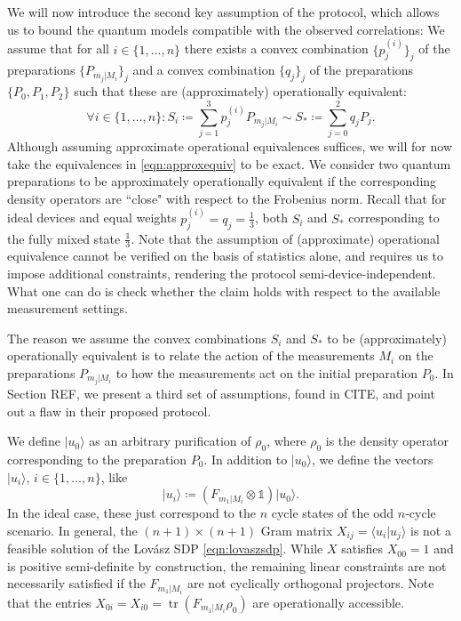 We will now introduce the second key assumption of the protocol, which allows us to bound the quantum models compatible with the observed correlations: We assume that for all $i\in\{1,\dots,n\}$ there exists a convex combination $\{p_j^{(i)}\}_j$ of the preparations $\{P_{m_j\vert M_i}\}_j$ and a convex combination $\{q_j\}_j$ of the preparations $\{P_0,P_1,P_2\}$ such that these are (approximately) operationally equivalent:
\begin{equation}
\label{eqn:approxequiv}
\forall i\in\{1,\dots,n\}: S_i \coloneqq \sum_{j=1}^3 p_j^{(i)}P_{m_j\vert M_i} \sim S_* \coloneqq \sum_{j=0}^2 q_j P_j.
\end{equation}
Although assuming approximate operational equivalences suffices, we will for now take the equivalences in \ref{eqn:approxequiv} to be exact. We consider two quantum preparations to be approximately operationally equivalent if the corresponding density operators are ``close" with respect to the Frobenius norm. Recall that for ideal devices and equal weights $p_j^{(i)}=q_j=\frac{1}{3}$, both $S_i$ and $S_{*}$ corresponding to the fully mixed state $\frac{\mathbb{1}}{3}$. Note that the assumption of (approximate) operational equivalence cannot be verified on the basis of statistics alone, and requires us to impose additional constraints, rendering the protocol semi-device-independent. What one can do is check whether the claim holds with respect to the available measurement settings. 

The reason we assume the convex combinations $S_i$ and $S_{*}$ to be (approximately) operationally equivalent is to relate the action of the measurements $M_i$ on the preparations $P_{m_j\vert M_i}$ to how the measurements act on the initial preparation $P_0$. In Section REF, we present a third set of assumptions, found in CITE, and point out a flaw in their proposed protocol. 

We define $\vert u_0 \rangle$ as an arbitrary purification of $\rho_0$, where $\rho_0$ is the density operator corresponding to the preparation $P_0$. In addition to $\vert u_0 \rangle$, we define the vectors $\vert u_i \rangle$, $i \in \{1,\dots,n\}$, like
\begin{equation}
\label{eqn:gramvectors}
\vert u_i \rangle \coloneqq (F_{m_1\vert M_i}\otimes\mathbb{1})\vert u_0 \rangle.
\end{equation}
In the ideal case, these just correspond to the $n$ cycle states of the odd $n$-cycle scenario. In general, the $(n+1)\times(n+1)$ Gram matrix $X_{ij}=\langle u_i \vert u_j \rangle$ is not a feasible solution of the Lovász SDP \ref{eqn:lovaszsdp}. While $X$ satisfies $X_{00}=1$ and is positive semi-definite by construction, the remaining linear constraints are not necessarily satisfied if the $F_{m_1\vert M_i}$ are not cyclically orthogonal projectors. Note that the entries $X_{0i}=X_{i0}=\operatorname{tr}(F_{m_1\vert M_i} \rho_0)$ are operationally accessible. 

